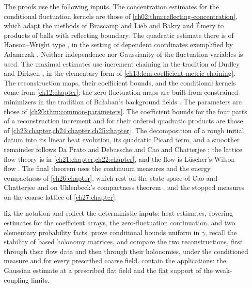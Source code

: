 The proofs use the following inputs. The concentration estimates for the conditional fluctuation kernels are those of \cref{ch02:thm:reflecting-concentration}, which adapt the methods of Brascamp and Lieb \cite{BrascampLieb1976} and Bakry and \'Emery \cite{BakryEmery1985} to products of balls with reflecting boundary. The quadratic estimate there is of Hanson--Wright type \cite{HansonWright1971}, in the setting of dependent coordinates exemplified by Adamczak \cite{Adamczak2015}. Neither independence nor Gaussianity of the fluctuation variables is used. The maximal estimates use increment chaining in the tradition of Dudley \cite{Dudley1967} and Dirksen \cite[Theorems~3.2 and~3.5]{Dirksen2015}, in the elementary form of \cref{ch13:lem:coefficient-metric-chaining}. The reconstruction maps, their coefficient bounds, and the conditional kernels come from \cref{ch12:chapter}; the zero-fluctuation maps are built from constrained minimizers in the tradition of Ba\l aban's background fields \cite{Balaban1985Variational,Balaban1984I,Balaban1984II,Balaban1985Background}. The parameters are those of \cref{ch20:thm:common-parameters}. The coefficient bounds for the four parts of a reconstruction increment and for their ordered quadratic products are those of \cref{ch23:chapter,ch24:chapter,ch25:chapter}. The decomposition of a rough initial datum into its linear heat evolution, its quadratic Picard term, and a smoother remainder follows Da Prato and Debussche \cite{DaPratoDebussche2003} and Cao and Chatterjee \cite{CCHeat2022v4}; the lattice flow theory is in \cref{ch21:chapter,ch22:chapter}, and the flow is L\"uscher's Wilson flow \cite{Luscher2010WilsonFlow}. The final theorem uses the continuum measures and the energy compactness of \cref{ch26:chapter}, which rest on the state space of Cao and Chatterjee \cite{CCState2023v4} and on Uhlenbeck's compactness theorem \cite{Uhlenbeck1982Connections}, and the stopped measures on the coarse lattice of \cref{ch27:chapter}.

 fix the notation and collect the deterministic inputs: heat estimates, covering estimates for the coefficient arrays, the zero-fluctuation continuation, and two elementary probability facts.  prove conditional bounds uniform in $\gamma$, recall the stability of based holonomy matrices, and compare the two reconstructions, first through their flow data and then through their holonomies, under the conditioned measure and for every prescribed coarse field.  contain the applications: the Gaussian estimate at a prescribed flat field and the flat support of the weak-coupling limits.

